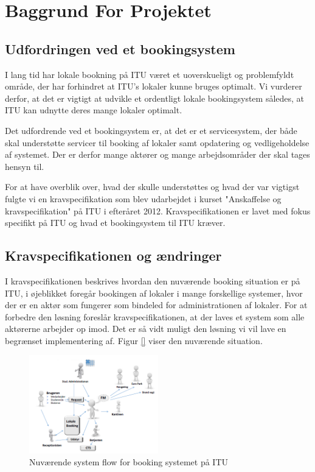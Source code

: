 \chapter{Baggrund For Projektet}
\label{Background}
\section{Udfordringen ved et bookingsystem}
\label{Baggrund_Udfording}
I lang tid har lokale bookning på ITU været et uoverskueligt og problemfyldt område, der har forhindret at ITU's lokaler kunne bruges optimalt. Vi vurderer derfor, at det er vigtigt at udvikle et ordentligt lokale bookingsystem således, at ITU kan udnytte deres mange lokaler optimalt.

 Det udfordrende ved et bookingsystem er, at det er et servicesystem, der både skal understøtte servicer til booking af lokaler samt opdatering og vedligeholdelse af systemet. Der er derfor mange aktører og mange arbejdsområder der skal tages hensyn til.

 For at have overblik over, hvad der skulle understøttes og hvad der var vigtigst fulgte vi en kravspecifikation som blev udarbejdet i kurset "Anskaffelse og kravspecifikation" på ITU i efteråret 2012. Kravspecifikationen er lavet med fokus specifikt på ITU og hvad et bookingsystem til ITU kræver.
\section{Kravspecifikationen og ændringer}
\label{Baggrund_kravspecifikationen}
I kravspecifikationen beskrives hvordan den nuværende booking situation er på ITU, i øjeblikket foregår bookingen af lokaler i mange forskellige systemer, hvor der er en aktør som fungerer som bindeled for administrationen af lokaler. For at forbedre den løsning foreslår kravspecifikationen, at der laves et system som alle aktørerne arbejder op imod. Det er så vidt muligt den løsning vi vil lave en begrænset implementering af. Figur \ref{} viser den nuværende situation.

\begin{figure}[h!]
  \centering
    \includegraphics[width=0.5\textwidth]{Appendix/GUI-Prototype/NuvaerendeFlow}
  \caption{Nuværende system flow for booking systemet på ITU}
\label{Baggrund_kravspecifikationen_NuvaerendeFlow}
\end{figure}


